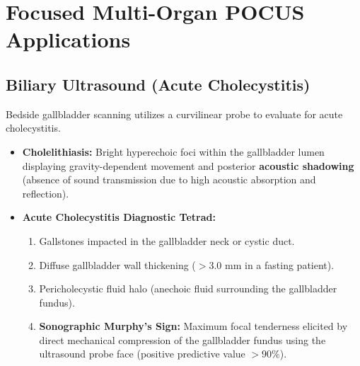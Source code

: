 \documentclass[11pt,a4paper]{article}
\begin{document}
\section{Focused Multi-Organ POCUS Applications}

\subsection{Biliary Ultrasound (Acute Cholecystitis)}
Bedside gallbladder scanning utilizes a curvilinear probe to evaluate for acute cholecystitis.
\begin{itemize}[leftmargin=2em]
    \item \textbf{Cholelithiasis:} Bright hyperechoic foci within the gallbladder lumen displaying gravity-dependent movement and posterior \textbf{acoustic shadowing} (absence of sound transmission due to high acoustic absorption and reflection).
    \item \textbf{Acute Cholecystitis Diagnostic Tetrad:}
    \begin{enumerate}
        \item Gallstones impacted in the gallbladder neck or cystic duct.
        \item Diffuse gallbladder wall thickening ($> 3.0\text{ mm}$ in a fasting patient).
        \item Pericholecystic fluid halo (anechoic fluid surrounding the gallbladder fundus).
        \item \textbf{Sonographic Murphy's Sign:} Maximum focal tenderness elicited by direct mechanical compression of the gallbladder fundus using the ultrasound probe face (positive predictive value $> 90\%$).
    \end{enumerate}
\end{itemize}
\end{document}
